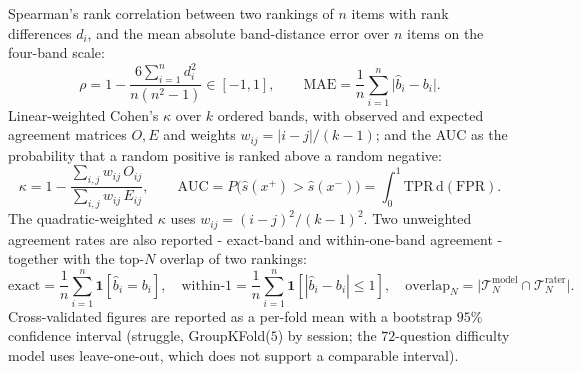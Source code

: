 Spearman's rank correlation between two rankings of $n$ items with rank differences $d_i$, and the mean absolute band-distance error over $n$ items on the four-band scale:
\[
    \rho = 1 - \frac{6\sum_{i=1}^{n} d_i^2}{n(n^2-1)} \in [-1,1],
    \qquad
    \mathrm{MAE} = \frac{1}{n}\sum_{i=1}^{n} \big|\hat{b}_i - b_i\big|.
\]
Linear-weighted Cohen's $\kappa$ over $k$ ordered bands, with observed and expected agreement matrices $O,E$ and weights $w_{ij} = |i-j|/(k-1)$; and the AUC as the probability that a random positive is ranked above a random negative:
\[
    \kappa = 1 - \frac{\sum_{i,j} w_{ij}\,O_{ij}}{\sum_{i,j} w_{ij}\,E_{ij}},
    \qquad
    \mathrm{AUC} = P\big(\hat{s}(x^{+}) > \hat{s}(x^{-})\big)
    = \int_0^1 \mathrm{TPR}\,\mathrm{d}(\mathrm{FPR}).
\]
The quadratic-weighted $\kappa$ uses $w_{ij} = (i-j)^2/(k-1)^2$. Two unweighted agreement rates are also reported - exact-band and within-one-band agreement - together with the top-$N$ overlap of two rankings:
\[
    \mathrm{exact} = \frac{1}{n}\sum_{i=1}^{n} \mathbf{1}\!\left[\hat{b}_i = b_i\right],
    \quad
    \mathrm{within\text{-}1} = \frac{1}{n}\sum_{i=1}^{n} \mathbf{1}\!\left[|\hat{b}_i - b_i| \le 1\right],
    \quad
    \mathrm{overlap}_N = \big|\mathcal{T}^{\mathrm{model}}_N \cap \mathcal{T}^{\mathrm{rater}}_N\big|.
\]
Cross-validated figures are reported as a per-fold mean with a bootstrap $95\%$ confidence interval (struggle, GroupKFold($5$) by session; the $72$-question difficulty model uses leave-one-out, which does not support a comparable interval).

